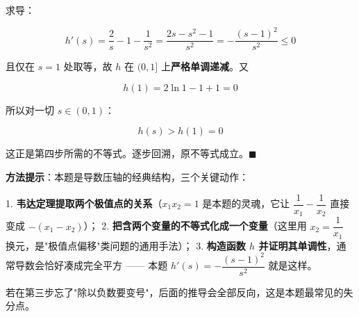 \begin{answer}
求导：

\nopagebreak[4]
\[h'(s)=\frac2s-1-\frac1{s^{2}}=\frac{2s-s^{2}-1}{s^{2}}=-\frac{(s-1)^{2}}{s^{2}}\le0\]

且仅在 $s=1$ 处取等，故 $h$ 在 $(0,1]$ 上\textbf{严格单调递减}。又

\nopagebreak[4]
\[h(1)=2\ln1-1+1=0\]

所以对一切 $s\in(0,1)$：

\nopagebreak[4]
\[h(s)>h(1)=0\]

这正是第四步所需的不等式。逐步回溯，原不等式成立。$\blacksquare$

\begin{gktip}
\textbf{方法提示}：本题是导数压轴的经典结构，三个关键动作：

1. \textbf{韦达定理提取两个极值点的关系}（$x_1x_2=1$ 是本题的灵魂，它让 $\dfrac1{x_1}-\dfrac1{x_2}$ 直接变成 $-\left(x_1-x_2\right)$）；
2. \textbf{把含两个变量的不等式化成一个变量}（这里用 $x_2=\dfrac1{x_1}$ 换元，是"极值点偏移"类问题的通用手法）；
3. \textbf{构造函数 $h$ 并证明其单调性}，通常导数会恰好凑成完全平方 —— 本题 $h'(s)=-\dfrac{(s-1)^{2}}{s^{2}}$ 就是这样。

若在第三步忘了"除以负数要变号"，后面的推导会全部反向，这是本题最常见的失分点。
\end{gktip}



\par\medskip

\end{answer}

